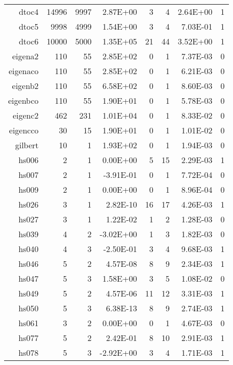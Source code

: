 \begin{table}[htbp]
\begin{tabular}{rrrrrrrr}
    dtoc4 & 14996 & 9997  & 2.87E+00 & 3     & 4     & 2.64E+00 & 1 \\
    dtoc5 & 9998  & 4999  & 1.54E+00 & 3     & 4     & 7.03E-01 & 1 \\
    dtoc6 & 10000 & 5000  & 1.35E+05 & 21    & 44    & 3.52E+00 & 1 \\
    eigena2 & 110   & 55    & 2.85E+02 & 0     & 1     & 7.37E-03 & 0 \\
    eigenaco & 110   & 55    & 2.85E+02 & 0     & 1     & 6.21E-03 & 0 \\
    eigenb2 & 110   & 55    & 6.58E+02 & 0     & 1     & 8.60E-03 & 0 \\
    eigenbco & 110   & 55    & 1.90E+01 & 0     & 1     & 5.78E-03 & 0 \\
    eigenc2 & 462   & 231   & 1.01E+04 & 0     & 1     & 8.33E-02 & 0 \\
    eigencco & 30    & 15    & 1.90E+01 & 0     & 1     & 1.01E-02 & 0 \\
    gilbert & 10    & 1     & 1.93E+02 & 0     & 1     & 1.94E-03 & 0 \\
    hs006 & 2     & 1     & 0.00E+00 & 5     & 15    & 2.29E-03 & 1 \\
    hs007 & 2     & 1     & -3.91E-01 & 0     & 1     & 7.72E-04 & 0 \\
    hs009 & 2     & 1     & 0.00E+00 & 0     & 1     & 8.96E-04 & 0 \\
    hs026 & 3     & 1     & 2.82E-10 & 16    & 17    & 4.26E-03 & 1 \\
    hs027 & 3     & 1     & 1.22E-02 & 1     & 2     & 1.28E-03 & 0 \\
    hs039 & 4     & 2     & -3.02E+00 & 1     & 3     & 1.82E-03 & 0 \\
    hs040 & 4     & 3     & -2.50E-01 & 3     & 4     & 9.68E-03 & 1 \\
    hs046 & 5     & 2     & 4.57E-08 & 8     & 9     & 2.34E-03 & 1 \\
    hs047 & 5     & 3     & 1.58E+00 & 3     & 5     & 1.08E-02 & 0 \\
    hs049 & 5     & 2     & 4.57E-06 & 11    & 12    & 3.31E-03 & 1 \\
    hs050 & 5     & 3     & 6.38E-13 & 8     & 9     & 2.74E-03 & 1 \\
    hs061 & 3     & 2     & 0.00E+00 & 0     & 1     & 4.67E-03 & 0 \\
    hs077 & 5     & 2     & 2.42E-01 & 8     & 10    & 2.91E-03 & 1 \\
    hs078 & 5     & 3     & -2.92E+00 & 3     & 4     & 1.71E-03 & 1 \\

\end{tabular}
\end{table}
